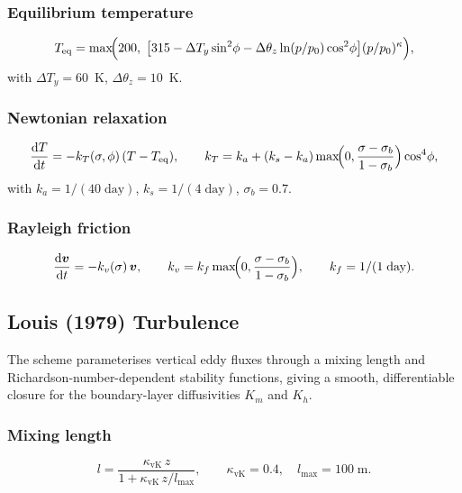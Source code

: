 \documentclass[11pt,a4paper]{article}
\newcommand{\dd}{\mathrm{d}}
\newcommand{\pref}{p_0}
\begin{document}
\subsubsection{Equilibrium temperature}
\begin{equation}
  T_{\mathrm{eq}} = \max\!\Bigl(200,\;\bigl[315-\Delta T_y\sin^2\!\phi - \Delta\theta_z\ln(p/\pref)\cos^2\!\phi\bigr](p/\pref)^\kappa\Bigr),
\end{equation}
with $\Delta T_y=60$~K, $\Delta\theta_z=10$~K.

\subsubsection{Newtonian relaxation}
\begin{equation}
  \frac{\dd T}{\dd t} = -k_T(\sigma,\phi)\,(T-T_{\mathrm{eq}}), \qquad
  k_T = k_a + (k_s-k_a)\max\!\Bigl(0,\frac{\sigma-\sigma_b}{1-\sigma_b}\Bigr)\cos^4\!\phi,
\end{equation}
with $k_a=1/(40\;\text{day})$, $k_s=1/(4\;\text{day})$, $\sigma_b=0.7$.

\subsubsection{Rayleigh friction}
\begin{equation}
  \frac{\dd\bm v}{\dd t} = -k_v(\sigma)\,\bm v, \qquad
  k_v = k_f\max\!\Bigl(0,\frac{\sigma-\sigma_b}{1-\sigma_b}\Bigr), \qquad k_f=1/(1\;\text{day}).
\end{equation}

\subsection{Louis (1979) Turbulence}

The \citet{Louis1979} scheme parameterises vertical eddy fluxes through
a mixing length and Richardson-number-dependent stability functions,
giving a smooth, differentiable closure for the boundary-layer
diffusivities $K_m$ and $K_h$.

\subsubsection{Mixing length}
\begin{equation}
  l = \frac{\kappa_{\mathrm{vK}}\,z}{1+\kappa_{\mathrm{vK}}\,z/l_{\max}}, \qquad \kappa_{\mathrm{vK}}=0.4,\quad l_{\max}=100\;\text{m}.
\end{equation}
\end{document}
